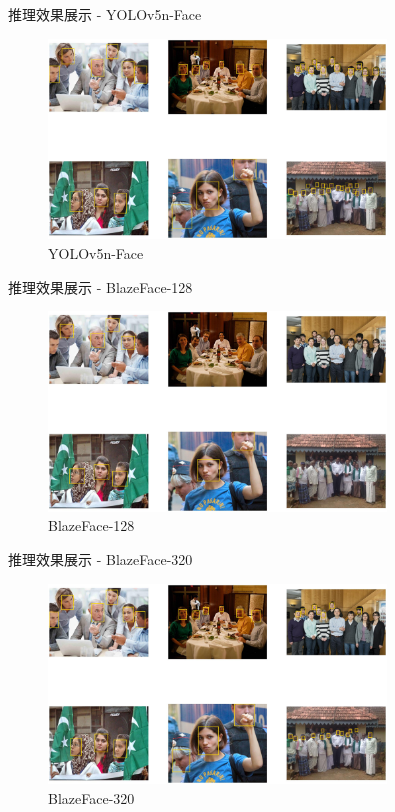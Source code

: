 \documentclass{beamer}
\begin{document}
\begin{frame}{推理效果展示 - YOLOv5n-Face}
    \begin{figure}
        \centering
        \includegraphics[width=0.8\textwidth]{pic/infer_result/yolov5n_face.jpg}
        \caption{YOLOv5n-Face}
    \end{figure}
\end{frame}

\begin{frame}{推理效果展示 - BlazeFace-128}
    \begin{figure}
        \centering
        \includegraphics[width=0.8\textwidth]{pic/infer_result/blazeface_128.jpg}
        \caption{BlazeFace-128}
    \end{figure}
\end{frame}

\begin{frame}{推理效果展示 - BlazeFace-320}
    \begin{figure}
        \centering
        \includegraphics[width=0.8\textwidth]{pic/infer_result/blazeface_320.jpg}
        \caption{BlazeFace-320}
    \end{figure}
\end{frame}
\end{document}
